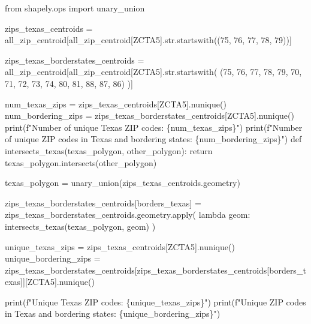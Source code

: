 \documentclass[
  letterpaper,
  DIV=11,
  numbers=noendperiod]{scrartcl}
\newenvironment{Shaded}{\begin{snugshade}}{\end{snugshade}}
\newcommand{\NormalTok}[1]{\textcolor[rgb]{0.00,0.23,0.31}{#1}}
\begin{document}
\begin{Shaded}
\begin{Highlighting}[]
\NormalTok{from shapely.ops import unary\_union}

\NormalTok{zips\_texas\_centroids = all\_zip\_centroid[all\_zip\_centroid[\textquotesingle{}ZCTA5\textquotesingle{}].str.startswith((\textquotesingle{}75\textquotesingle{}, \textquotesingle{}76\textquotesingle{}, \textquotesingle{}77\textquotesingle{}, \textquotesingle{}78\textquotesingle{}, \textquotesingle{}79\textquotesingle{}))]}

\NormalTok{zips\_texas\_borderstates\_centroids = all\_zip\_centroid[all\_zip\_centroid[\textquotesingle{}ZCTA5\textquotesingle{}].str.startswith(}
\NormalTok{    (\textquotesingle{}75\textquotesingle{}, \textquotesingle{}76\textquotesingle{}, \textquotesingle{}77\textquotesingle{}, \textquotesingle{}78\textquotesingle{}, \textquotesingle{}79\textquotesingle{}, \textquotesingle{}70\textquotesingle{}, \textquotesingle{}71\textquotesingle{}, \textquotesingle{}72\textquotesingle{}, \textquotesingle{}73\textquotesingle{}, \textquotesingle{}74\textquotesingle{}, \textquotesingle{}80\textquotesingle{}, \textquotesingle{}81\textquotesingle{}, \textquotesingle{}88\textquotesingle{}, \textquotesingle{}87\textquotesingle{}, \textquotesingle{}86\textquotesingle{})}
\NormalTok{)]}

\NormalTok{num\_texas\_zips = zips\_texas\_centroids[\textquotesingle{}ZCTA5\textquotesingle{}].nunique()}
\NormalTok{num\_bordering\_zips = zips\_texas\_borderstates\_centroids[\textquotesingle{}ZCTA5\textquotesingle{}].nunique()}
\NormalTok{print(f"Number of unique Texas ZIP codes: \{num\_texas\_zips\}")}
\NormalTok{print(f"Number of unique ZIP codes in Texas and bordering states: \{num\_bordering\_zips\}")}
\NormalTok{def intersects\_texas(texas\_polygon, other\_polygon):}
\NormalTok{    return texas\_polygon.intersects(other\_polygon)}

\NormalTok{texas\_polygon = unary\_union(zips\_texas\_centroids.geometry)}

\NormalTok{zips\_texas\_borderstates\_centroids[\textquotesingle{}borders\_texas\textquotesingle{}] = zips\_texas\_borderstates\_centroids.geometry.apply(}
\NormalTok{    lambda geom: intersects\_texas(texas\_polygon, geom)}
\NormalTok{)}

\NormalTok{unique\_texas\_zips = zips\_texas\_centroids[\textquotesingle{}ZCTA5\textquotesingle{}].nunique()}
\NormalTok{unique\_bordering\_zips = zips\_texas\_borderstates\_centroids[zips\_texas\_borderstates\_centroids[\textquotesingle{}borders\_texas\textquotesingle{}]][\textquotesingle{}ZCTA5\textquotesingle{}].nunique()}

\NormalTok{print(f"Unique Texas ZIP codes: \{unique\_texas\_zips\}")}
\NormalTok{print(f"Unique ZIP codes in Texas and bordering states: \{unique\_bordering\_zips\}")}
\end{Highlighting}
\end{Shaded}
\end{document}
